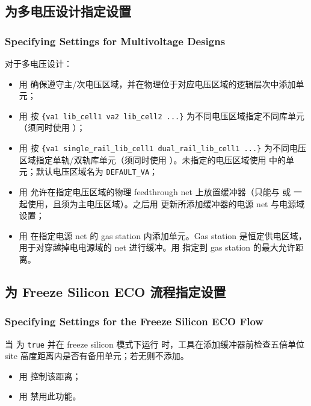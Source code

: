 \subsection{为多电压设计指定设置}
\subsubsection*{Specifying Settings for Multivoltage Designs}

对于多电压设计：
\begin{itemize}
  \item 用  确保遵守主/次电压区域，并在物理位于对应电压区域的逻辑层次中添加单元；
  \item 用  按 \texttt{\{va1 lib\_cell1 va2 lib\_cell2 ...\}} 为不同电压区域指定不同库单元（须同时使用 ）；
  \item 用  按 \texttt{\{va1 single\_rail\_lib\_cell1 dual\_rail\_lib\_cell1 ...\}} 为不同电压区域指定单轨/双轨库单元（须同时使用 ）。未指定的电压区域使用  中的单元；默认电压区域名为 \texttt{DEFAULT\_VA}；
  \item 用  允许在指定电压区域的物理 feedthrough net 上放置缓冲器（只能与  或  一起使用，且须为主电压区域）。之后用  更新所添加缓冲器的电源 net 与电源域设置；
  \item 用  在指定电源 net 的 gas station 内添加单元。Gas station 是恒定供电区域，用于对穿越掉电电源域的 net 进行缓冲。用  指定到 gas station 的最大允许距离。
\end{itemize}

\subsection{为 Freeze Silicon ECO 流程指定设置}
\subsubsection*{Specifying Settings for the Freeze Silicon ECO Flow}

当  为 \texttt{true} 并在 freeze silicon 模式下运行  时，工具在添加缓冲器前检查五倍单位 site 高度距离内是否有备用单元；若无则不添加。
\begin{itemize}
  \item 用  控制该距离；
  \item 用  禁用此功能。
\end{itemize}

